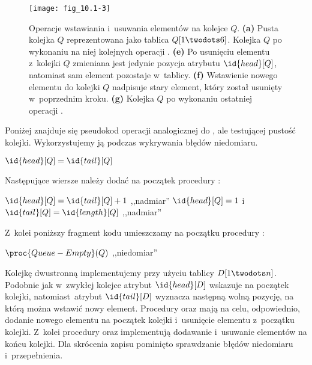 \begin{figure}[ht]
	\begin{center}
		\texttt{[image: fig\_10.1-3]}
	\end{center}
	\caption{Operacje wstawiania i~usuwania elementów na kolejce $Q$. {\sffamily\bfseries(a)} Pusta kolejka $Q$ reprezentowana jako tablica $Q[1\twodots6]$. {\sffamily\bfseries{}} Kolejka $Q$ po wykonaniu na niej kolejnych operacji . {\sffamily\bfseries(e)} Po usunięciu elementu z~kolejki $Q$ zmieniana jest jedynie pozycja atrybutu $\id{head}[Q]$, natomiast sam element pozostaje w~tablicy. {\sffamily\bfseries(f)} Wstawienie nowego elementu do kolejki $Q$ nadpisuje stary element, który został usunięty w~poprzednim kroku. {\sffamily\bfseries(g)} Kolejka $Q$ po wykonaniu ostatniej operacji .} \label{fig:10.1-3}
\end{figure}

\exercise %
Poniżej znajduje się pseudokod operacji analogicznej do , ale testującej pustość kolejki. Wykorzystujemy ją podczas wykrywania błędów niedomiaru.

\begin{codebox}
\li	\If $\id{head}[Q]=\id{tail}[Q]$
\li		\Then \Return {}
\li		\Else \Return {}
\End
\end{codebox}

Następujące wiersze należy dodać na początek procedury :
\begin{codebox}
\zi	\If $\id{head}[Q]=\id{tail}[Q]+1$
\zi		\Then \Error ,,nadmiar''
		\End
\zi	\If $\id{head}[Q]=1$ i~$\id{tail}[Q]=\id{length}[Q]$
\zi		\Then \Error ,,nadmiar''
		\End
\end{codebox}
Z~kolei poniższy fragment kodu umieszczamy na początku procedury :
\begin{codebox}
\zi	\If $\proc{Queue-Empty}(Q)$
\zi		\Then \Error ,,niedomiar''
		\End
\end{codebox}

\exercise %
Kolejkę dwustronną implementujemy przy użyciu tablicy $D[1\twodots n]$. Podobnie jak w~zwykłej kolejce atrybut $\id{head}[D]$ wskazuje na początek kolejki, natomiast~atrybut $\id{tail}[D]$ wyznacza następną wolną pozycję, na którą można wstawić nowy element. Procedury  oraz  mają na celu, odpowiednio, dodanie nowego elementu na początek kolejki i~usunięcie elementu z~początku kolejki. Z~kolei procedury  oraz  implementują dodawanie i~usuwanie elementów na końcu kolejki. Dla skrócenia zapisu pominięto sprawdzanie błędów niedomiaru i~przepełnienia.


